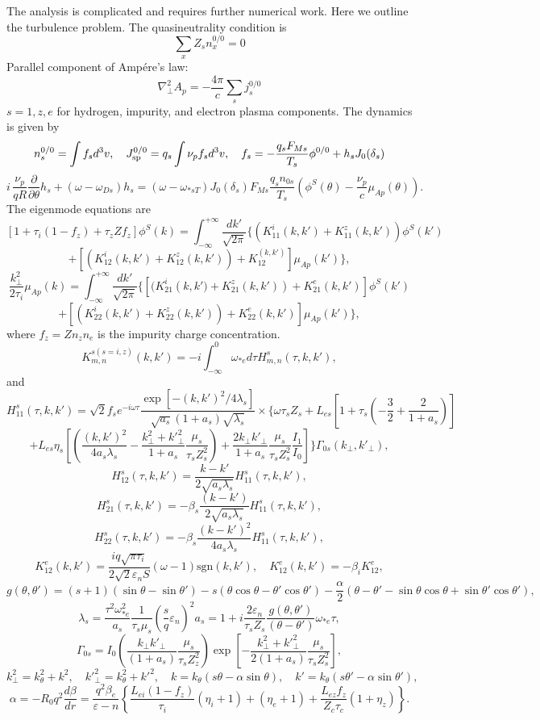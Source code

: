 \documentclass[a4paper,openany,12pt]{book}
\begin{document}
{The analysis is complicated and requires further numerical work. Here we outline the turbulence problem.
The quasineutrality condition is
$$\sum_xZ_sn_x^{0/0}=0$$
Parallel component of Amp\'ere's law:
$$\nabla_\perp^2A_p=-\frac{4\pi}{c}\sum_sj_s^{0/0}$$
$s=1, z, e$ for hydrogen, impurity, and electron plasma components. The dynamics is given by
$$n_s^{0/0}=\int f_sd^3v,\quad J_{\rm sp}^{0/0}=q_s\int\nu_pf_sd^3v,\quad f_s=
-\frac{q_s F_{Ms}}{T_s}\phi^{0/0}+h_s  J_0(\delta_s)$$
$$i\,\frac{\nu_p}{qR}\frac{\partial}{\partial\theta}h_s+(\omega-\omega_{Ds})h_s=(\omega-\omega_{*sT}) J_0(\delta_s)F_{Ms}\frac{q_sn_{0s}}{T_s}
\left(\phi^S(\theta)-\frac{\nu_p}{c}\mu_{Ap}(\theta)\right).$$
The eigenmode equations are
$$\left[1+\tau_i(1-f_z)+\tau_zZf_z\right]\phi^S(k)=\int_{-\infty}^{+\infty}\frac{dk'}{\sqrt{2\pi}}\Bigg\{(K_{11}^i(k, k')+K_{11}^z(k, k'))\phi^S(k')$$
$$+\left[\left(K_{12}^i(k, k')+K_{12}^z(k, k')\right)+K_{12}^(k, k')\right]\mu_{Ap}(k')\Bigg\},$$
$$\frac{k_\perp^2}{2\tau_i}\mu_{Ap}(k)=\int_{-\infty}^{+\infty}\frac{dk'}{\sqrt{2\pi}}\Bigg\{\left[(K_{21}^i\left(k, k')+K_{21}^z(k, k')\right)+K_{21}^e(k, k')\right]\phi^S(k')$$
$$+\left[\left(K_{22}^i(k, k')+K_{22}^z(k, k')\right)+K_{22}^e(k, k')\right]\mu_{Ap}(k')\Bigg\},$$
where $f_z=Zn_zn_e$ is the impurity charge concentration.
$$K_{m,n}^{s(s=i,z)}(k, k')=-i\int_{-\infty}^0\omega_{*e}d\tau H_{m,n}^s(\tau, k, k'),$$
and
$$H_{11}^s(\tau, k, k')=\sqrt 2 f_se^{-i\omega\tau}\frac{\exp[-(k,k')^2/4\lambda_s]}
{\sqrt{a_s}(1+a_s)\sqrt{\lambda_s}}\times\Bigg\{\omega\tau_sZ_s+L_{es}
\left[1+\tau_s\left(-\frac{3}{2}+\frac{2}{1+a_s}\right)\right]$$
$$+L_{es}\eta_s\left[\left(\frac{(k,k')^2}{4a_s\lambda_s}-\frac{k_\perp^2+k'^2_\perp}{1+a_s}\frac{\mu_s}{\tau_sZ_s^2}\right)+\frac{2k_\perp k'_\perp}{1+a_s}\frac{\mu_s}{\tau_s Z_s^2}
\frac{I_1}{I_0}\right]\Bigg\}\Gamma_{0s}(k_\perp, k'_\perp),$$
$$H_{12}^s(\tau, k, k')=\frac{k-k'}{2\sqrt{a_s\lambda_s}}H_{11}^s(\tau, k, k'),$$
$$H_{21}^s(\tau, k, k')=-\beta_s\frac{(k-k')}{2\sqrt{a_s\lambda_s}}H_{11}^s(\tau, k, k'),$$
$$H_{22}^s(\tau, k, k')=-\beta_s\frac{(k-k')^2}{4a_s\lambda_s}H_{11}^s(\tau, k, k'),$$
$$K_{12}^e(k, k')=\frac{iq\sqrt{\pi\tau_i}}{2\sqrt 2\varepsilon_nS}(\omega-1)\mathrm{sgn}(k, k'),\quad K_{12}^e(k, k')=-\beta_iK_{12}^e,$$
$$g(\theta,\theta')=(s+1)(\sin\theta-\sin\theta')-s(\theta\cos\theta-\theta'\cos\theta')-\frac{\alpha}{2}(\theta-\theta'-\sin\theta\cos\theta+\sin\theta'\cos\theta'),$$
$$\lambda_s=\frac{\tau^2\omega_{*e}^2}{a_s}\frac{1}{\tau_s\mu_s}
\left(\frac{s}{q}\varepsilon_n\right)^2 a_s=1+i\frac{2\varepsilon_n}{\tau_sZ_s}\frac{g(\theta,\theta')}{(\theta-\theta')}
\omega_{*e}\tau,$$
$$\Gamma_{0s}=I_0\left(\frac{k_\perp k'_\perp}{(1+a_s)}\frac{\mu_s}{\tau_sZ_z^2}\right)\exp\left[-\frac{k_\perp^2+k'^2_\perp}{2(1+a_s)}\frac{\mu_s}{\tau_s Z_s^2}\right],$$
$$k_\perp^2=k_\theta^2+k^2,\quad k'^2_\perp=k_\theta^2+k'^2,\quad k=k_\theta(s\theta-\alpha\sin\theta),\quad k'=k_\theta(s\theta'-\alpha\sin\theta'),$$
$$\alpha=-R_0q^2\frac{d\beta}{dr}=\frac{q^2\beta_e}{\varepsilon-n}\left\{\frac{L_{ei}(1-f_z)}{\tau_i}(\eta_i+1)+(\eta_e+1)+\frac{L_{ez}f_z}{Z_c\tau_c}(1+\eta_z)\right\}.$$

}
\end{document}
